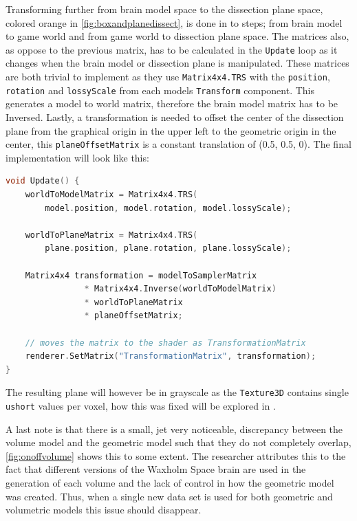 Transforming further from brain model space to the dissection plane space, colored orange in \autoref{fig:boxandplanedissect}, is done in to steps; from brain model to game world and from game world to dissection plane space. The matrices also, as oppose to the previous matrix, has to be calculated in the \texttt{Update} loop as it changes when the brain model or dissection plane is manipulated. These matrices are both trivial to implement as they use \texttt{Matrix4x4.TRS} with the \texttt{position}, \texttt{rotation} and \texttt{lossyScale} from each models \texttt{Transform} component.  This generates a model to world matrix, therefore the brain model matrix has to be Inversed. Lastly, a transformation is needed to offset the center of the dissection plane from the graphical origin in the upper left to the geometric origin in the center, this \texttt{planeOffsetMatrix} is a constant translation of (0.5, 0.5, 0). The final implementation will look like this:
\begin{lstlisting}[language=c++]
void Update() {
    worldToModelMatrix = Matrix4x4.TRS(
        model.position, model.rotation, model.lossyScale);

    worldToPlaneMatrix = Matrix4x4.TRS(
        plane.position, plane.rotation, plane.lossyScale);

    Matrix4x4 transformation = modelToSamplerMatrix 
                * Matrix4x4.Inverse(worldToModelMatrix)
                * worldToPlaneMatrix
                * planeOffsetMatrix;

    // moves the matrix to the shader as TransformationMatrix
    renderer.SetMatrix("TransformationMatrix", transformation);
}
\end{lstlisting}
The resulting plane will however be in grayscale as the \texttt{Texture3D} contains single \texttt{ushort} values per voxel, how this was fixed will be explored in .

A last note is that there is a small, jet very noticeable, discrepancy between the volume model and the geometric model such that they do not completely overlap, \autoref{fig:onoffvolume} shows this to some extent. The researcher attributes this to the fact that different versions of the Waxholm Space brain are used in the generation of each volume and the lack of control in how the geometric model was created. Thus, when a single new data set is used for both geometric and volumetric models this issue should disappear.

